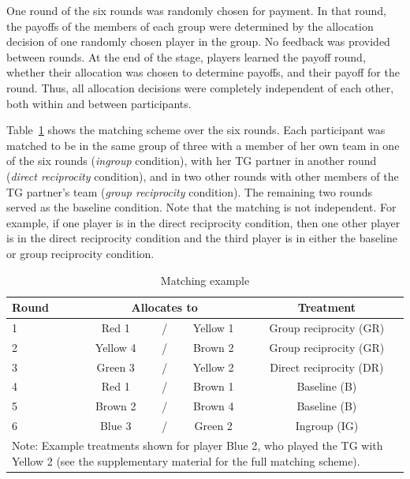 \documentclass[12pt,a4paper]{article}\usepackage[]{graphicx}\usepackage[]{color}
\begin{document}
One round of the six rounds was randomly chosen for payment. In that round, the payoffs of the members of each group were determined by the allocation decision of one randomly chosen player in the group. No feedback was provided between rounds. At the end of the stage, players learned the payoff round, whether their allocation was chosen to determine payoffs, and their payoff for the round. Thus, all allocation decisions were completely independent of each other, both within and between participants.


Table~\ref{tab:example} shows the matching scheme over the six rounds. Each participant was matched to be in the same group of three with a member of her own team in one of the six rounds (\emph{ingroup} condition), with her TG partner in another round (\emph{direct reciprocity} condition), and in two other rounds with other members of the TG partner's team (\emph{group reciprocity} condition). The remaining two rounds served as the baseline condition. Note that the matching is not independent. For example, if one player is in the direct reciprocity condition, then one other player is in the direct reciprocity condition and the third player is in either the baseline or group reciprocity condition. 


\begin{table}
  \caption{Matching example}\label{tab:example}
  \begin{center}
    \begin{tabular}{lcccc}
    \toprule
    Round	&	\multicolumn{3}{c}{Allocates to}		&	Treatment	\\
    \midrule
    1	&	\color{red}Red 1	&	/	&	\color{yellow!80!black}Yellow 1	&	Group reciprocity (GR)	\\
    2	&	\color{yellow!80!black}Yellow 4	&	/	&	\color{brown}Brown 2	&	Group reciprocity (GR)	\\
    3	&	\color{green!60!black}Green 3	&	/	&	\color{yellow!80!black}Yellow 2	&	Direct reciprocity (DR)	\\
    4	&	\color{red}Red 1	&	/	&	\color{brown}Brown 1	&	Baseline (B)	\\
    5	&	\color{brown}Brown 2	&	/	&	\color{brown}Brown 4	&	Baseline (B)	\\
    6	&	\color{blue}Blue 3	&	/	&	\color{green!60!black}Green 2	&	Ingroup (IG)	\\
    \bottomrule
    \multicolumn{5}{p{0.7\textwidth}}{\footnotesize
	Note: Example treatments shown for player {\color{blue}Blue 2}, who played the TG with {\color{yellow!80!black}Yellow 2} (see the supplementary material for the full matching scheme).    
    }
    \end{tabular}
  \end{center}
\end{table}
\end{document}
